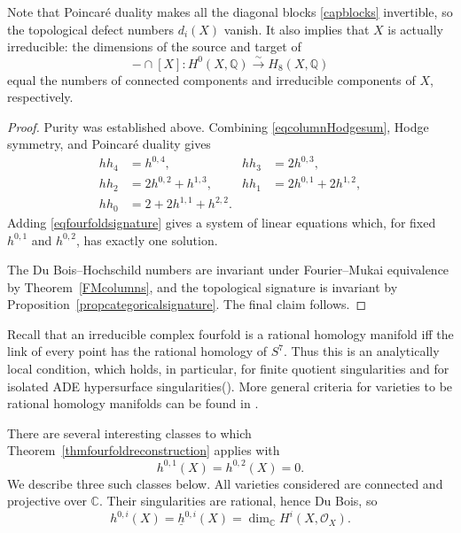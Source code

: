 \documentclass{amsart}
\theoremstyle{plain}
\theoremstyle{definition}
\newcommand{\bbC}{\mathbb{C}}
\newcommand{\bbQ}{\mathbb{Q}}
\begin{document}
Note that Poincar\'e duality makes all the diagonal blocks \eqref{capblocks} invertible, so the topological defect numbers $d_i(X)$ vanish. It also implies that $X$ is actually irreducible: the dimensions of the source and target of
\[
-\cap[X]:H^0(X,\bbQ)\xrightarrow{\sim}H_8(X,\bbQ)
\]
equal the numbers of connected components and irreducible components of $X$, respectively.

\begin{proof}
Purity was established above. Combining \eqref{eqcolumnHodgesum}, Hodge symmetry, and Poincar\'e duality gives
\[
\begin{aligned}
hh_4&=h^{0,4},&
hh_3&=2h^{0,3},\\
hh_2&=2h^{0,2}+h^{1,3},&
hh_1&=2h^{0,1}+2h^{1,2},\\
hh_0&=2+2h^{1,1}+h^{2,2}.
\end{aligned}
\]
Adding \eqref{eqfourfoldsignature} gives a system of linear equations which, for fixed $h^{0,1}$ and $h^{0,2}$, has exactly one solution.

The Du Bois--Hochschild numbers are invariant under Fourier--Mukai equivalence by Theorem~\ref{FMcolumns}, and the topological signature is invariant by Proposition~\ref{propcategoricalsignature}.
The final claim follows.
\end{proof}

Recall that an irreducible complex fourfold is a rational homology manifold iff the link of every point has the rational homology of $S^7$. Thus this is an analytically local condition, which holds, in particular, for finite quotient singularities and for isolated ADE hypersurface singularities(\cite{Web96}). More general criteria for varieties to be rational homology manifolds can be found in \cite{PP25a}.

There are several interesting classes to which Theorem~\ref{thmfourfoldreconstruction} applies with
\[
h^{0,1}(X)=h^{0,2}(X)=0.
\]
We describe three such classes below. All varieties considered are connected and projective over $\bbC$. Their singularities are rational, hence Du Bois, so
\[
h^{0,i}(X)
=\underline h^{0,i}(X)
=\dim_\bbC H^i(X,\mathcal O_X).
\]
\end{document}
